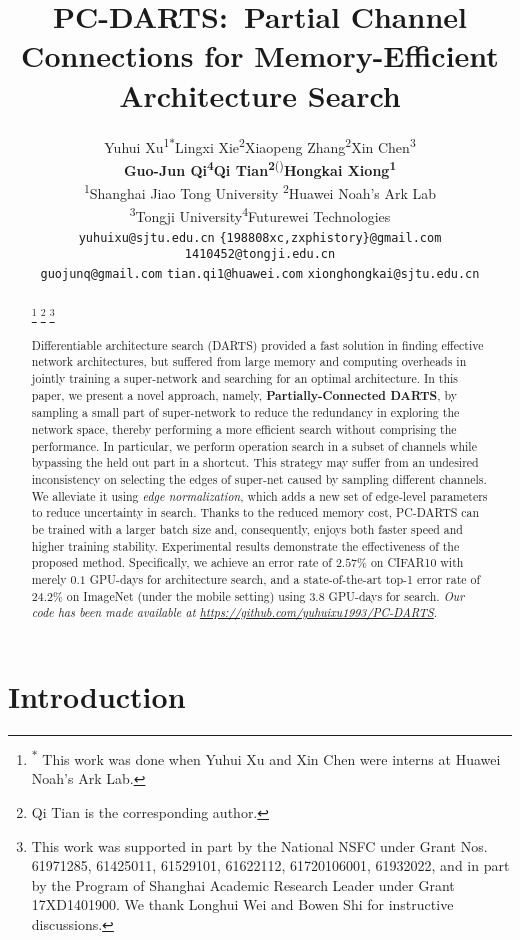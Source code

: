 \documentclass{article} \usepackage{iclr2020_conference,times}
\title{PC-DARTS:\ Partial Channel Connections for Memory-Efficient Architecture Search}
\author{Yuhui Xu\textsuperscript{1$\ast$}\quad Lingxi Xie\textsuperscript{2}\quad Xiaopeng Zhang\textsuperscript{2}\quad Xin Chen\textsuperscript{3}\\
  \textbf{Guo-Jun Qi}\textsuperscript{\textbf{4}}\quad \textbf{Qi Tian}\textsuperscript{\textbf{2}(\Letter)}\quad \textbf{Hongkai Xiong}\textsuperscript{\textbf{1}} \\
  \textsuperscript{1}Shanghai Jiao Tong University \quad \textsuperscript{2}Huawei Noah's Ark Lab\\
  \textsuperscript{3}Tongji University\quad \textsuperscript{4}Futurewei Technologies \\
  \small\texttt{yuhuixu@sjtu.edu.cn}\quad
  \small\texttt{\{198808xc,zxphistory\}@gmail.com}\quad
  \small\texttt{1410452@tongji.edu.cn}\\
  \small\texttt{guojunq@gmail.com}\quad
  \small\texttt{tian.qi1@huawei.com}\quad
  \small\texttt{xionghongkai@sjtu.edu.cn}
}
\begin{document}
\maketitle

\begin{abstract}
\let\thefootnote\relax\footnote{\textsuperscript{$\ast$} This work was done when Yuhui Xu and Xin Chen were interns at Huawei Noah's Ark Lab.}
\footnote{\textsuperscript{\Letter} Qi Tian is the corresponding author.}
\let\thefootnote\relax\footnote{This work was supported in part by the National NSFC under Grant Nos. 61971285, 61425011, 61529101, 61622112, 61720106001, 61932022, and in part by the Program of Shanghai Academic Research Leader under Grant 17XD1401900. We thank Longhui Wei and Bowen Shi for instructive discussions.}

Differentiable architecture search (DARTS) provided a fast solution in finding effective network architectures, but suffered from large memory and computing overheads in jointly training a super-network and searching for an optimal architecture. In this paper, we present a novel approach, namely, \textbf{Partially-Connected DARTS}, by sampling a small part of super-network to reduce the redundancy in exploring the network space, thereby performing a more efficient search without comprising the performance. In particular, we perform operation search in a subset of channels while bypassing the held out part in a shortcut. This strategy may suffer from an undesired inconsistency on selecting the edges of super-net caused by sampling different channels. We alleviate it using \textit{edge normalization}, which adds a new set of edge-level parameters to reduce uncertainty in search. Thanks to the reduced memory cost, PC-DARTS can be trained with a larger batch size and, consequently, enjoys both faster speed and higher training stability. Experimental results demonstrate the effectiveness of the proposed method. Specifically, we achieve an error rate of $2.57\%$ on CIFAR10 with merely $0.1$ GPU-days for architecture search, and a state-of-the-art top-1 error rate of $24.2\%$ on ImageNet (under the mobile setting) using 3.8 GPU-days for search. \textit{Our code has been made available at \url{https://github.com/yuhuixu1993/PC-DARTS}}.
\end{abstract}

\section{Introduction}
\label{Introduction}
\end{document}
